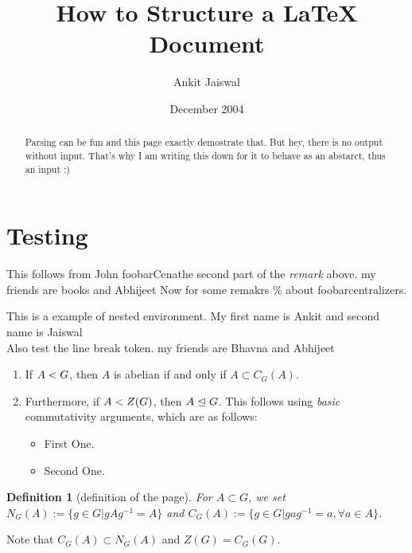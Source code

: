 \documentclass[master.tex]{subfiles}
\author{Ankit Jaiswal}
\newcommand{\foo}{foobar}
\newcommand{\jc}{John \foo Cena}
\newcommand{\name}[2]{My first name is #1 and second name is #2}
\newcommand{\withDefault}[2][books]{my friends are #1 and #2}
\newtheorem{defn*}{Definition}[section]
\begin{document}
  \title{How to Structure a LaTeX Document}
  \date{December 2004}
  \begin{abstract}
  Parsing can be fun and this page exactly demostrate that.
  But hey, there is no output without input. That's why I am writing this
  down for it to behave as an abstarct, thus an input :)
  \end{abstract}

  \maketitle

  \section{Testing}
  This follows from \jc the second part of the \textit{remark} above.
  \withDefault{Abhijeet}
  Now for some remakrs \% about \foo centralizers. %
  \vspace{1cm}
  \begin{rmk*}[1.1.3]
    This is a example of nested environment. \name{Ankit}{Jaiswal} \\
    Also test the line break token. \withDefault[Bhavna]{Abhijeet}
    \begin{enumerate}
    \item\label{pehla} If $A \mathrel{<} G$, \medskip then $A$ is abelian if and only if $A \subset
      C_G(A)$.
    \item Furthermore, if $A \mathrel{<} Z(G)$, then $A \mathrel{\unlhd} G$. \newline
      This follows using \emph{basic} commutativity arguments, which are as follows:
      \begin{itemize}
        \item First One.
        \item Second One.
      \end{itemize}
    \end{enumerate}
  \end{rmk*}
  \begin{defn*}[definition of the page]
      For $A \subset G$, we set $N_G(A) := \{g \in G | gAg^{-1} = A\}$ and
      $C_G(A) := \{g \in G | gag^{-1} = a, \forall a \in A\}$.
  \end{defn*}
  Note that $C_G(A) \subset N_G(A)$ and $Z(G) = C_G(G)$.
\end{document}
